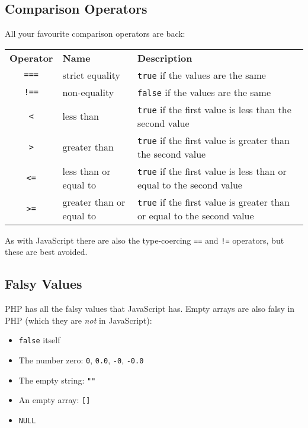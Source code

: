 \subsection{Comparison Operators}

All your favourite comparison operators are back:
\\

\begin{small}
    \begin{tabularx}{\textwidth}{c l X}
        \textbf{Operator} & \textbf{Name} & \textbf{Description} \\
        \texttt{===} & strict equality & \texttt{true} if the values are the same \\
        \texttt{!==} & non-equality & \texttt{false} if the values are the same\\
        \texttt{<} & less than & \texttt{true} if the first value is less than the second value  \\
        \texttt{>} & greater than & \texttt{true} if the first value is greater than the second value\\
        \texttt{<=} & less than or equal to & \texttt{true} if the first value is less than or equal to the second value  \\
        \texttt{>=} & greater than or equal to & \texttt{true} if the first value is greater than or equal to the second value
    \end{tabularx}
\end{small}

\par\bigskip

As with JavaScript there are also the type-coercing \texttt{==} and \texttt{!=} operators, but these are best avoided.


\subsection{Falsy Values}

PHP has all the falsy values that JavaScript has. Empty arrays are also falsy in PHP (which they are \textit{not} in JavaScript):

\begin{itemize}
    \item \texttt{false} itself
    \item The number zero: \texttt{0}, \texttt{0.0}, \texttt{-0}, \texttt{-0.0}
    \item The empty string: \texttt{""}
    \item An empty array: \texttt{[]}
    \item \texttt{NULL}
\end{itemize}



